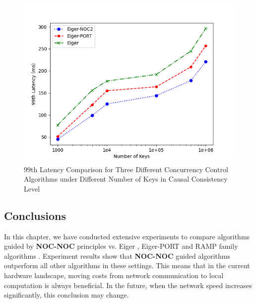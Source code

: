 \begin{figure}[H]
    \centering
    \includegraphics[width=0.8\linewidth]{figure/6-tcc-l.png}
    \caption{99th Latency Comparison for Three Different Concurrency Control Algorithms under Different Number of Keys in Causal Consistency Level}
    \label{fig:30}
\end{figure}


\subsection{Conclusions}
In this chapter, we have conducted extensive experiments to compare algorithms guided by \textbf{NOC-NOC} principles vs. Eiger \cite{lloyd2013stronger}, Eiger-PORT \cite{lu2020performance} and RAMP family algorithms \cite{bailis2016scalable}. Experiment results show that \textbf{NOC-NOC} guided algorithms outperform all other algorithms in these settings. This means that in the current hardware landscape, moving costs from network communication to local computation is always beneficial.  In the future, when the network speed increases significantly, this conclusion may change.